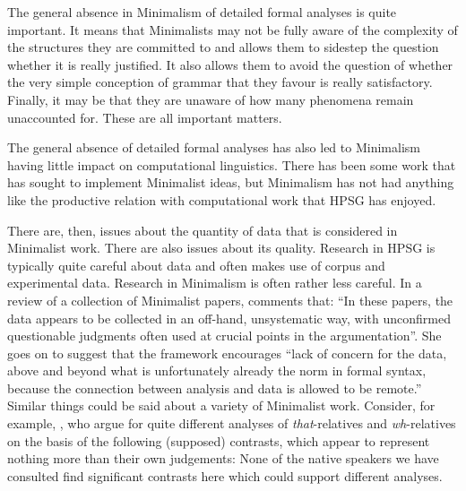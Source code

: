 \documentclass[output=paper]{langsci/langscibook}
\begin{document}
The general absence in Minimalism of detailed formal analyses is quite important. It means that Minimalists may not be fully aware of the complexity of the structures they are committed to and allows them to sidestep the question whether it is really justified. It also allows them to avoid the question of whether the very simple conception of grammar that they favour is really satisfactory. Finally, it may be that they are unaware of how many phenomena remain unaccounted for. These are all important matters. 

The general absence of detailed formal analyses has also led to Minimalism having little impact on computational linguistics. There has been some work that has sought to implement Minimalist ideas, but Minimalism has not had anything like the productive relation with computational work that HPSG has enjoyed.

There are, then, issues about the quantity of data that is considered in Minimalist work. There are also issues about its quality. Research in HPSG is typically quite careful about data and often makes use of corpus and experimental data. Research in Minimalism is often rather less careful. In a review of a collection of Minimalist papers, \citet[434]{Bender2002a} comments that: ``In these papers, the data appears to be collected in an off-hand, unsystematic way, with unconfirmed questionable judgments often used at crucial points in the argumentation''. She goes on to suggest that the framework encourages ``lack of concern for the data, above and beyond what is unfortunately already the norm in formal syntax, because the connection between analysis and data is allowed to be remote.'' Similar things could be said about a variety of Minimalist work. Consider, for example, \citet{AounLi.2003}, who argue for quite different analyses of \textit{that}-relatives and \textit{wh}-relatives on the basis of the following (supposed) contrasts, which appear to represent nothing more than their own judgements:
\eal
{}
\label{ex:min-headway-that}
\label{ex:min-headway-which}
\zl
\eal
{}
\label{ex:min-admire-that}
\label{ex:min-admire-which} 
\zl
\eal
{}
\label{ex:min-picture-that}
\label{ex:min-picture-which} 
\zl
None of the native speakers we have consulted find significant contrasts here which could support different analyses.
\end{document}
